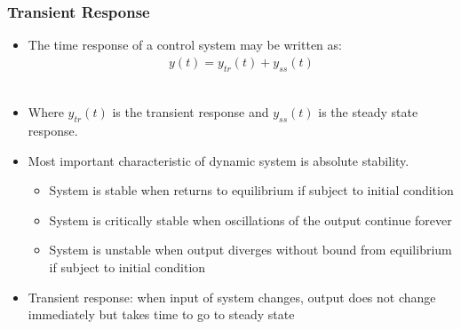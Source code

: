 

\begin{frame}
\frametitle{Transient Response}
\begin{itemize}
\item The time response of a control system may be written as:
\begin{align*}
y(t) = y_{tr}(t) + y_{ss}(t)
\end {align*}
\\\item Where $y_{tr}(t)$ is the transient response and $y_{ss}(t)$ is the steady state response.
\item Most important characteristic of dynamic system is absolute stability.
\begin{itemize}
\item System is stable when returns to equilibrium if subject to initial condition
\item System is critically stable when oscillations of the output continue forever
\item System is unstable when output diverges without bound from equilibrium if subject to initial condition
\end{itemize}
\item Transient response: when input of system changes, output does not change immediately but takes time to go to steady state
\end{itemize}
\end{frame}


